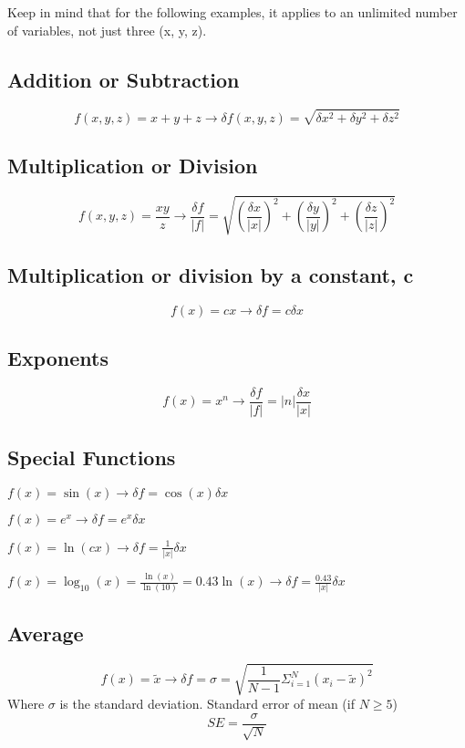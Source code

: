 Keep in mind that for the following examples, it applies to an unlimited number of variables, not
just three (x, y, z).

\subsection{Addition or Subtraction}
\[
    f(x,y,z)=x+y+z\to\delta f(x,y,z)=\sqrt{\delta x^2+\delta y^2+\delta z^2}
\]

\subsection{Multiplication or Division}
\[
    f(x,y,z)=\frac{xy}{z}\to \frac{\delta f}{|f|}=\sqrt{\left(\frac{\delta x}{|x|}\right)^2+\left(\frac{\delta y}{|y|}\right)^2+ \left(\frac{\delta z}{|z|}\right)^2}
\]

\subsection{Multiplication or division by a constant, c}
\[
    f(x)=cx\to\delta f=c\delta x
\]

\subsection{Exponents}
\[
    f(x)=x^n\to \frac{\delta f}{|f|}=|n|\frac{\delta x}{|x|}
\]

\subsection{Special Functions}
\begin{enum}
    \item $f(x)=\sin(x)\to\delta f=\cos(x)\delta x$
    \item $f(x)=e^x\to\delta f=e^x\delta x$
    \item $f(x)=\ln(cx)\to\delta f=\frac{1}{|x|}\delta x$
    \item $f(x)=\log_{10}(x)=\frac{\ln(x)}{\ln(10)}=0.43\ln(x)\to\delta f=\frac{0.43}{|x|}\delta x$
\end{enum}

\subsection{Average}
\[
    f(x)=\tilde{x}\to\delta f=\sigma=\sqrt{\frac{1}{N-1}\Sigma_{i=1}^N(x_i-\tilde{x})^2}
\]
Where $\sigma$ is the standard deviation. Standard error of mean (if $N\geq5$)
\[
    SE=\frac{\sigma}{\sqrt{N}}
\]